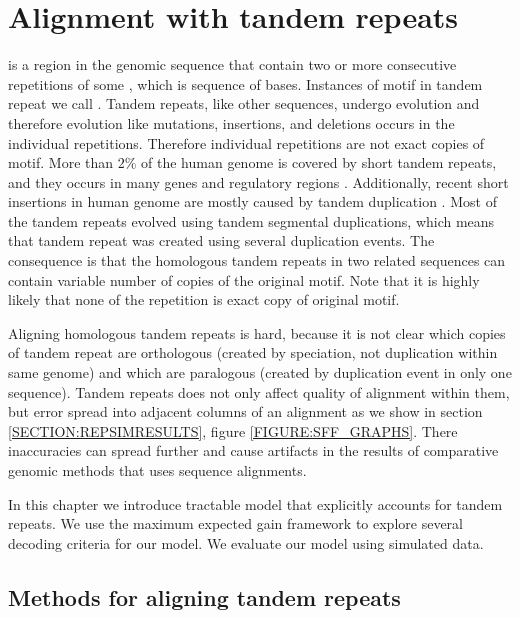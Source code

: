 \chapter{Alignment with tandem repeats}
 is a region in the genomic sequence that contain two
or more consecutive repetitions of some , which is sequence
of bases. Instances of motif in tandem repeat we call .
Tandem repeats, like other sequences, undergo evolution and therefore evolution
like mutations, insertions, and deletions occurs in the individual repetitions.
Therefore individual repetitions are not exact copies of motif. More than $2\%$
of the human genome is covered by short tandem repeats, and they occurs in many
genes and regulatory regions \cite{Gemayel2010}. Additionally, recent short
insertions in human genome are mostly caused by tandem duplication
\cite{Messer2007}. Most of the tandem repeats evolved using tandem segmental
duplications, which means that tandem repeat was created using several
duplication events. The consequence is that the homologous tandem repeats in
two related sequences can contain variable number of copies of the original
motif. Note that it is highly likely that none of the repetition is exact copy
of original motif.

Aligning homologous tandem repeats is hard, because it is not clear which
copies of tandem repeat are orthologous (created by speciation, not duplication
within same genome) and which are paralogous (created by duplication event in
only one sequence). Tandem repeats does not only affect quality of alignment
within them, but error spread into adjacent columns of an alignment as we show
in section \ref{SECTION:REPSIMRESULTS}, figure \ref{FIGURE:SFF_GRAPHS}.  There
inaccuracies can spread further and cause artifacts in the results of
comparative genomic methods that uses sequence alignments.

In this chapter we introduce tractable model that explicitly accounts for
tandem repeats. We use the maximum expected gain framework to explore several
decoding criteria for our model. We evaluate our model using simulated data. 

\section{Methods for aligning tandem repeats}\label{SECTION:REPALNMETHODS}

